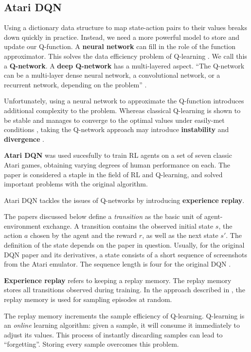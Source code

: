 \subsection{Atari DQN}

Using a dictionary data structure to map state-action pairs to their values breaks down quickly in practice.
Instead, we need a more powerful model to store and update our Q-function.
A \textbf{neural network} can fill in the role of the function approximator.
This solves the data efficiency problem of Q-learning \cite{long-peak-rl}.
We call this a \textbf{Q-network}.
A \textbf{deep Q-network} has a multi-layered aspect.
``The Q-network can be a multi-layer dense neural network, a convolutional network, or a recurrent network, depending on the problem'' \cite{long-peak-rl}.

Unfortunately, using a neural network to approximate the Q-function introduces additional complexity to the problem.
Whereas classical Q-learning is shown to be stable and manages to converge to the optimal values under easily-met conditions \cite{atari-dqn},
taking the Q-network approach may introduce \textbf{instability} and \textbf{divergence} \cite{long-peak-rl}.

\textbf{Atari DQN} \cite{atari-dqn} was used sucesfully to train RL agents on a set of seven classic Atari games, obtaining varying degrees of human performance on each.
The paper is considered a staple in the field of RL and Q-learning, and solved important problems with the original algorithm.

Atari DQN tackles the issues of Q-networks by introducing 
\textbf{experience replay}.

The papers discussed below define a \emph{transition} as the basic unit of agent-environment exchange.
A transition contains the observed initial state \(s\), the action \(a\) chosen by the agent and the reward \(r\), as well as the next state \(s'\). The definition of the state depends on the paper in question.
Usually, for the original DQN paper and its derivatives, a state consists of a short sequence of screenshots from the Atari emulator. The sequence length is four for the original DQN \cite{atari-dqn}.

\textbf{Experience replay} refers to keeping a replay memory.
The replay memory stores all transitions observed during training.
In the approach described in \cite{atari-dqn}, the replay memory is used for sampling episodes at random.

The replay memory increments the sample efficiency of Q-learning.
Q-learning is an \emph{online} learning algorithm: given a sample, it will consume it immediately to adjust its values.
This process of instantly discarding samples can lead to ``forgetting''.
Storing every sample overcomes this problem.

